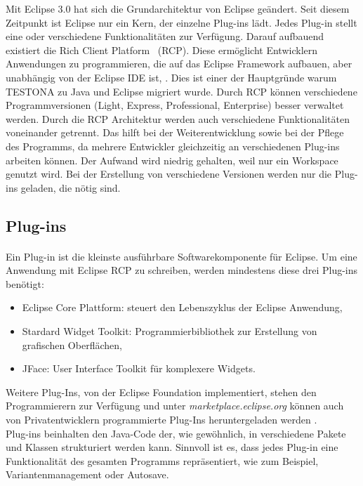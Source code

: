 Mit Eclipse 3.0 hat sich die Grundarchitektur von Eclipse geändert. Seit diesem Zeitpunkt ist Eclipse nur ein Kern, der einzelne Plug-ins lädt. Jedes Plug-in stellt eine oder verschiedene Funktionalitäten zur Verfügung. Darauf aufbauend existiert die \glqq Rich Client Platform\grqq~ (RCP). Diese ermöglicht Entwicklern Anwendungen zu programmieren, die auf das Eclipse Framework aufbauen, aber unabhängig von der Eclipse IDE ist\cite{EclipseRCP}, \cite{Eclipse}. Dies ist einer der Hauptgründe warum TESTONA zu Java und Eclipse migriert wurde. Durch RCP können verschiedene Programmversionen (Light, Express, Professional, Enterprise) besser verwaltet werden. Durch die RCP Architektur werden auch verschiedene Funktionalitäten voneinander getrennt. Das hilft bei der Weiterentwicklung sowie bei der Pflege des Programms, da mehrere Entwickler gleichzeitig an verschiedenen Plug-ins arbeiten können. Der Aufwand wird niedrig gehalten, weil nur ein Workspace genutzt wird. Bei der Erstellung von verschiedene Versionen werden nur die Plug-ins geladen, die nötig sind.


\subsection{Plug-ins}
\paragraph{}
Ein Plug-in ist die kleinste ausführbare Softwarekomponente für Eclipse. Um eine Anwendung mit Eclipse RCP zu schreiben, werden mindestens diese drei Plug-ins benötigt:

\begin{itemize}
\item Eclipse Core Plattform: steuert den Lebenszyklus der Eclipse Anwendung,
\item Stardard Widget Toolkit: Programmierbibliothek zur Erstellung von grafischen Oberflächen,
\item JFace: User Interface Toolkit für komplexere Widgets.
\end{itemize}

Weitere Plug-Ins, von der Eclipse Foundation implementiert, stehen den Programmierern zur Verfügung und unter \textit{marketplace.eclipse.org} können auch von Privatentwicklern programmierte Plug-Ins heruntergeladen werden \cite{Eclipse}.\\

Plug-ins beinhalten den Java-Code der, wie gewöhnlich, in verschiedene Pakete und Klassen strukturiert werden kann. Sinnvoll ist es, dass jedes Plug-in eine Funktionalität des gesamten Programms repräsentiert, wie zum Beispiel, Variantenmanagement oder Autosave.\\

